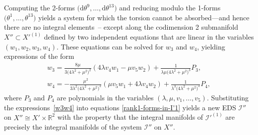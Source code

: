 \documentclass[pdftex]{sigma}
\numberwithin{equation}{section}
\renewcommand{\d}{\mathrm{d}}%
\newcommand{\cI}{{\mathcal I}}
\newcommand{\bbR}{{\mathbb R}}
\begin{document}
Computing the 2-forms $\big(\d\theta^9,\ldots,\d\theta^{13}\big)$ and reducing modulo the 1-forms $\big(\theta^1, \ldots, \theta^{13}\big)$ yields a system for which the torsion cannot be absorbed---and hence there are no integral elements~-- except along the codimension 2 submanifold $X'' \subset X'^{(1)}$ defined by two independent equations that are linear in the variables $(w_1, w_2, w_3, w_4)$. These equations can be solved for $w_3$ and $w_4$, yielding expressions of the form
\begin{gather}
w_3 = \frac{8\mu}{3\big(4\lambda^2 + \mu^2\big)^2} (4\lambda v_4 w_1 - \mu v_5 w_2 ) + \frac{1}{\lambda \mu \big(4\lambda^2 + \mu^2\big)^3} P_3, \nonumber\\
w_4 = -\frac{\mu^2}{3\lambda^2 \big(4\lambda^2 + \mu^2\big)^2} (\mu v_5 w_1 + 4 \lambda v_4 w_2 ) + \frac{1}{\lambda^3 \big(4\lambda^2 + \mu^2\big)^3} P_4,\label{w3w4}
\end{gather}
where $P_3$ and $P_4$ are polynomials in the variables $(\lambda, \mu, v_1, \ldots, v_5)$.
Substituting the expres\-sions~\eqref{w3w4} into equations \eqref{rank1-forms-in-I'1} yields a new EDS $\cI''$ on $X'' \cong X' \times \bbR^2$ with the property that the integral manifolds of $\cI'^{(1)}$ are precisely the integral manifolds of the system $\cI''$ on $X''$.
\end{document}
